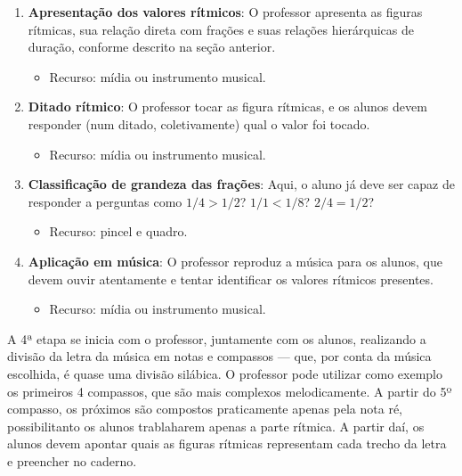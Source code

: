\documentclass[
  letterpaper,
  DIV=11,
  numbers=noendperiod]{scrreprt}
\providecommand{\tightlist}{%
  \setlength{\itemsep}{0pt}\setlength{\parskip}{0pt}}\usepackage{longtable,booktabs,array}
\begin{document}
\begin{enumerate}
\def\labelenumi{\arabic{enumi}.}
\tightlist
\item
  \textbf{Apresentação dos valores rítmicos}: O professor apresenta as
  figuras rítmicas, sua relação direta com frações e suas relações
  hierárquicas de duração, conforme descrito na seção anterior.

  \begin{itemize}
  \tightlist
  \item
    Recurso: mídia ou instrumento musical.
  \end{itemize}
\item
  \textbf{Ditado rítmico}: O professor tocar as figura rítmicas, e os
  alunos devem responder (num ditado, coletivamente) qual o valor foi
  tocado.

  \begin{itemize}
  \tightlist
  \item
    Recurso: mídia ou instrumento musical.
  \end{itemize}
\item
  \textbf{Classificação de grandeza das frações}: Aqui, o aluno já deve
  ser capaz de responder a perguntas como \(1/4>1/2\)? \(1/1<1/8\)?
  \(2/4=1/2\)?

  \begin{itemize}
  \tightlist
  \item
    Recurso: pincel e quadro.
  \end{itemize}
\item
  \textbf{Aplicação em música}: O professor reproduz a música para os
  alunos, que devem ouvir atentamente e tentar identificar os valores
  rítmicos presentes.

  \begin{itemize}
  \tightlist
  \item
    Recurso: mídia ou instrumento musical.
  \end{itemize}
\end{enumerate}

A 4ª etapa se inicia com o professor, juntamente com os alunos,
realizando a divisão da letra da música em notas e compassos --- que,
por conta da música escolhida, é quase uma divisão silábica. O professor
pode utilizar como exemplo os primeiros 4 compassos, que são mais
complexos melodicamente. A partir do 5º compasso, os próximos são
compostos praticamente apenas pela nota ré, possibilitanto os alunos
trablaharem apenas a parte rítmica. A partir daí, os alunos devem
apontar quais as figuras rítmicas representam cada trecho da letra e
preencher no caderno.
\end{document}

